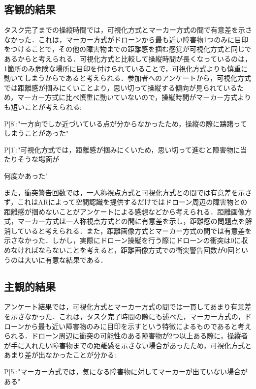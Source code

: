 \documentclass
[a4paper,11pt]{jreport}
\begin{document}
\subsection{客観的結果}
タスク完了までの操縦時間では，可視化方式とマーカー方式の間で有意差を示さなかった．これは，マーカー方式がドローンから最も近い障害物1つのみに目印をつけることで，その他の障害物までの距離感を掴む感覚が可視化方式と同じであるからと考えられる．可視化方式と比較して操縦時間が長くなっているのは，1箇所のみ危険な場所に目印を付けられていることで，可視化方式よりも慎重に動いてしまうからであると考えられる．参加者へのアンケートから，可視化方式では距離感が掴みにくいことより，思い切って操縦する傾向が見られているため，マーカー方式に比べ慎重に動いていないので，操縦時間がマーカー方式よりも短いことが考えられる:
\par
\vspace{5mm}
{\rm P[8]}:"一方向でしか近づいている点が分からなかったため，操縦の際に躊躇ってしまうことがあった"
\par
{\rm P[1]}:"可視化方式では，距離感が掴みにくいため，思い切って進むと障害物に当たりそうな場面が
\par 何度かあった"
\par
\vspace{5mm}
また，衝突警告回数では，一人称視点方式と可視化方式との間では有意差を示さず，これはARによって空間認識を提供するだけではドローン周辺の障害物との距離感が掴めないことがアンケートによる感想などから考えられる．距離画像方式，マーカー方式は一人称視点方式との間に有意差を示し，距離感の問題点を解消していると考えられる．また，距離画像方式とマーカー方式の間では有意差を示さなかった．しかし，実際にドローン操縦を行う際にドローンの衝突は0に収めなければならないことを考えると，距離画像方式での衝突警告回数が0回というのは大いに有意な結果である．

\subsection{主観的結果}
アンケート結果では，可視化方式とマーカー方式の間では一貫してあまり有意差を示さなかった．これは，タスク完了時間の際にも述べた，マーカー方式の，ドローンから最も近い障害物のみに目印を示すという特徴によるものであると考えられる．ドローン周辺に衝突の可能性のある障害物が2つ以上ある際に，操縦者が手に入れたい障害物までの距離感を示さない場合があったため，可視化方式とあまり差が出なかったことが分かる:
\par
\vspace{5mm}
{\rm P[5]}:"マーカー方式では，気になる障害物に対してマーカーが出ていない場合がある"
\vspace{5mm}
\par
\end{document}
